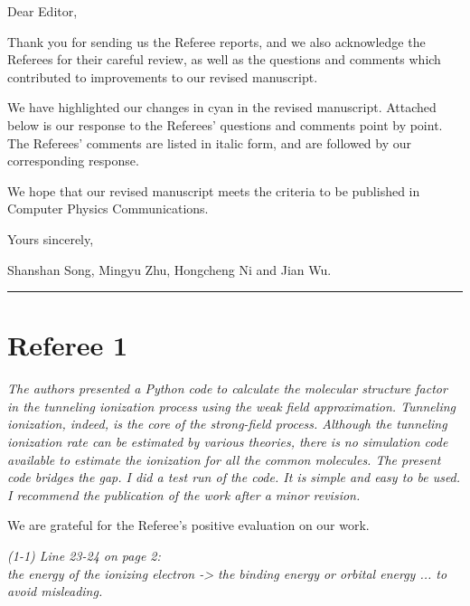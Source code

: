 \documentclass[a4paper,11pt]{article}
\begin{document}
\noindent
Dear Editor,

Thank you for sending us the Referee reports, and we also acknowledge the Referees for their careful review, as well as the questions and comments which contributed to improvements to our revised manuscript.

We have highlighted our changes in cyan in the revised manuscript.
Attached below is our response to the Referees' questions and comments point by point.
The Referees' comments are listed in italic form, and are followed by our corresponding response.

We hope that our revised manuscript meets the criteria to be published in Computer Physics Communications.

\hfill
Yours sincerely,

\hfill
Shanshan Song, Mingyu Zhu, Hongcheng Ni and Jian Wu.

\vspace{2em}

\rule{14cm}{0.5pt}

\vspace{2em}


\section*{Referee 1}

\textit{
The authors presented a Python code to calculate the molecular structure factor in the tunneling ionization process using the weak field approximation. Tunneling ionization, indeed, is the core of the strong-field process. Although the tunneling ionization rate can be estimated by various theories, there is no simulation code available to estimate the ionization for all the common molecules. The present code bridges the gap. I did a test run of the code. It is simple and easy to be used. I recommend the publication of the work after a minor revision.
}

\vspace{1em}

We are grateful for the Referee's positive evaluation on our work.

\vspace{2em}


\noindent\textit{
(1-1) Line 23-24 on page 2: \\
the energy of the ionizing electron -> the binding energy or orbital energy ... to avoid misleading.
}
\end{document}
